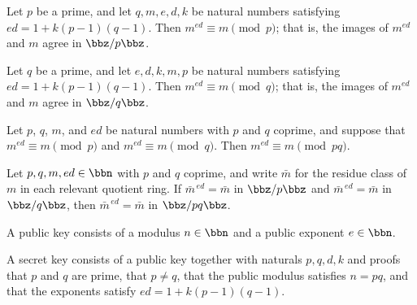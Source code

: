 \begin{lemma}
\label{RSA.rsa_zmod_p}
\leanok
{}
Let $p$ be a prime, and let $q, m, e, d, k$ be natural numbers satisfying $ed = 1 +
k(p-1)(q-1)$. Then $m^{ed} \equiv m \pmod{p}$; that is, the images of $m^{ed}$ and $m$
agree in $\bbz/p\bbz$.
\end{lemma}

\begin{lemma}
\label{RSA.rsa_zmod_q}
\leanok
{}
Let $q$ be a prime, and let $e, d, k, m, p$ be natural numbers satisfying $ed = 1 +
k(p-1)(q-1)$. Then $m^{ed} \equiv m \pmod{q}$; that is, the images of $m^{ed}$ and $m$
agree in $\bbz/q\bbz$.
\end{lemma}

\begin{lemma}
\label{RSA.rsa_crt}
\leanok
{}
Let $p$, $q$, $m$, and $ed$ be natural numbers with $p$ and $q$ coprime, and suppose
that $m^{ed} \equiv m \pmod{p}$ and $m^{ed} \equiv m \pmod{q}$. Then $m^{ed} \equiv m
\pmod{pq}$.
\end{lemma}

\begin{lemma}
\label{RSA.rsa_crt_pow}
\leanok
{}
Let $p, q, m, ed \in \bbn$ with $p$ and $q$ coprime, and write $\bar m$ for the residue
class of $m$ in each relevant quotient ring. If $\bar m^{\,ed} = \bar m$ in $\bbz/p\bbz$
and $\bar m^{\,ed} = \bar m$ in $\bbz/q\bbz$, then $\bar m^{\,ed} = \bar m$ in
$\bbz/pq\bbz$.
\end{lemma}

\begin{definition}
\label{RSA.PublicKey}
\leanok
A public key consists of a modulus $n \in \bbn$ and a public exponent $e \in \bbn$.
\end{definition}

\begin{definition}
\label{RSA.SecretKey}
\leanok
{}
A secret key consists of a public key together with naturals $p, q, d, k$ and proofs that $p$ and
$q$ are prime, that $p \ne q$, that the public modulus satisfies $n = pq$, and that the exponents
satisfy $e d = 1 + k(p-1)(q-1)$.
\end{definition}

